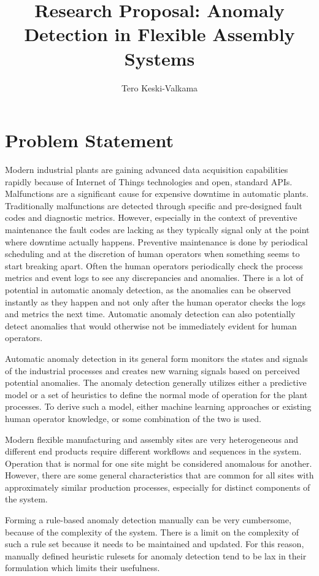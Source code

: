 \documentclass[a4paper,10pt]{article}
\title{Research Proposal: Anomaly Detection in Flexible Assembly Systems}
\author{Tero Keski-Valkama}
\begin{document}
\maketitle

\section{Problem Statement}

Modern industrial plants are gaining advanced data acquisition capabilities rapidly because of Internet of Things technologies and open, standard APIs.
Malfunctions are a significant cause for expensive downtime in automatic plants. Traditionally malfunctions are detected through specific and pre-designed fault codes
and diagnostic metrics. However, especially in the context of preventive maintenance the fault codes are lacking as they typically signal only at the point where downtime
actually happens. Preventive maintenance is done by periodical scheduling and at the discretion of human operators when something seems to start breaking apart.
Often the human operators periodically check the process metrics and event logs to see any discrepancies and anomalies. There is a lot of potential in automatic anomaly
detection, as the anomalies can be observed instantly as they happen and not only after the human operator checks the logs and metrics the next time. Automatic
anomaly detection can also potentially detect anomalies that would otherwise not be immediately evident for human operators.

Automatic anomaly detection in its general form monitors the states and signals of the industrial processes and creates new warning signals based on perceived potential anomalies.
The anomaly detection generally utilizes either a predictive model or a set of heuristics to define the normal mode of operation for the plant processes. To derive such a model,
either machine learning approaches or existing human operator knowledge, or some combination of the two is used.

Modern flexible manufacturing and assembly sites are very heterogeneous and different end products require different workflows and sequences in the system. Operation that is normal
for one site might be considered anomalous for another. However, there are some general characteristics that are common for all sites with approximately similar
production processes, especially for distinct components of the system.

Forming a rule-based anomaly detection manually can be very cumbersome, because of the complexity of the system. There is a limit on the complexity of such a rule set because
it needs to be maintained and updated. For this reason, manually defined heuristic rulesets for anomaly detection tend to be lax in their formulation which limits their usefulness.
\end{document}
